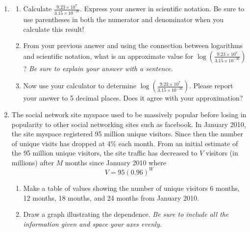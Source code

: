 \documentclass[12pt]{article}
\begin{document}
\newpage
\begin{enumerate}
\item \begin{enumerate}
\item Calculate $\displaystyle \frac{9.23 \times 10^{7}}{3.15 \times 10^{-26}} $. Express your answer in scientific notation.  Be sure to use parentheses in both the numerator and denominator when you calculate this result!
\vfill
\item From your previous answer and using the connection between logarithms and scientific notation, what is an approximate value for $\displaystyle \log \left( \frac{9.23 \times 10^{7}}{3.15 \times 10^{-26}} \right)$?  \emph{Be sure to explain your answer with a sentence.}
\vfill
\item Now use your calculator to determine  $\displaystyle \log \left(\frac{9.23 \times 10^{7}}{3.15 \times 10^{-26}}  \right)$. Please report your answer to 5 decimal places.  Does it agree with your approximation?
\vfill
\end{enumerate}
\newpage

\item The social network site myspace used to be massively popular before losing in popularity to other social networking sites such as facebook.  In January 2010, the site myspace registered 95 million unique visitors.  Since then the number of unique visits has dropped at 4\% each month.  From an initial estimate of the 95 million unique visitors, the site traffic has decreased to $V$ visitors (in millions) after $M$ months since January 2010 where $$V = 95(0.96)^W$$

\begin{enumerate}
\item Make a table of values showing the number of unique visitors 6 months, 12 months, 18 months, and 24 months from January 2010.
\vfill
\item Draw a graph illustrating the dependence.  \emph{Be sure to include all the information given and space your axes evenly.}


\end{enumerate}
\end{enumerate}
\end{document}
